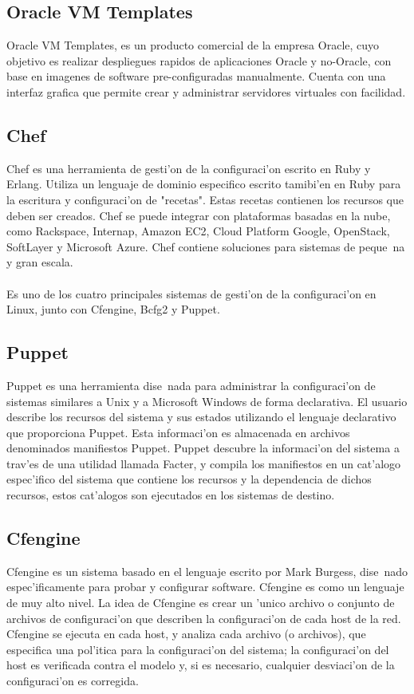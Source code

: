 \subsection{Oracle VM Templates}
Oracle VM Templates, es un producto comercial de la empresa Oracle, cuyo objetivo es realizar despliegues rapidos de aplicaciones Oracle y no-Oracle, con base en imagenes de software pre-configuradas manualmente. Cuenta con una interfaz grafica que permite crear y administrar servidores virtuales con facilidad. \cite{14}

\subsection{Chef}
Chef es una herramienta de gesti'on de la configuraci'on escrito en Ruby y Erlang. Utiliza un lenguaje de dominio especifico escrito tamibi'en en Ruby para la escritura y configuraci'on de "recetas". Estas recetas contienen los recursos que deben ser creados. Chef se puede integrar con plataformas basadas en la nube, como Rackspace, Internap, Amazon EC2, Cloud Platform Google, OpenStack, SoftLayer y Microsoft Azure. Chef contiene soluciones para sistemas de peque~na y gran escala. \cite{Chef15}\\
\\
Es uno de los cuatro principales sistemas de gesti'on de la configuraci'on en Linux, junto con Cfengine, Bcfg2 y Puppet.

\subsection{Puppet}
Puppet es una herramienta dise~nada para administrar la configuraci'on de sistemas similares a Unix y a Microsoft Windows de forma declarativa. El usuario describe los recursos del sistema y sus estados utilizando el lenguaje declarativo que proporciona Puppet. Esta informaci'on es almacenada en archivos denominados manifiestos Puppet. Puppet descubre la informaci'on del sistema a trav'es de una utilidad llamada Facter, y compila los manifiestos en un cat'alogo espec'ifico del sistema que contiene los recursos y la dependencia de dichos recursos, estos cat'alogos son ejecutados en los sistemas de destino. \cite{Pupet15}

\subsection{Cfengine}
Cfengine es un sistema basado en el lenguaje escrito por Mark Burgess, dise~nado espec'ificamente para probar y configurar software. Cfengine es como un lenguaje de muy alto nivel. La idea de Cfengine es crear un 'unico archivo o conjunto de archivos de configuraci'on que describen la configuraci'on de cada host de la red. Cfengine se ejecuta en cada host, y analiza cada archivo (o archivos), que especifica una pol'itica para la configuraci'on del sistema; la configuraci'on del host es verificada contra el modelo y, si es necesario, cualquier desviaci'on de la configuraci'on es corregida. \cite{cfengine15}

